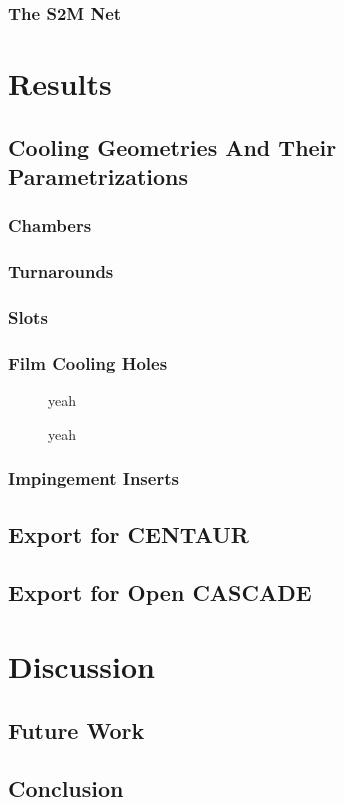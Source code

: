 \documentclass[a4paper, 11pt]{report}
\theoremstyle{definition}
\begin{document}
\subsection{The S2M Net}

\chapter{Results}
\section{Cooling Geometries And Their Parametrizations}
\subsection{Chambers}
\subsection{Turnarounds}
\subsection{Slots}
\subsection{Film Cooling Holes}
\begin{figure}[H]
	\centering
	
	\caption{yeah}
\end{figure}
\begin{figure}[H]
	\centering
	
	\caption{yeah}
\end{figure}


\subsection{Impingement Inserts}
\section{Export for CENTAUR}
\section{Export for Open CASCADE}

\chapter{Discussion}
\section{Future Work}
\section{Conclusion}
\cite{Piegl1997}

\printbibliography[heading=bibnumbered, title=References]
\end{document}
